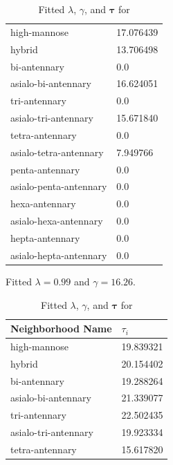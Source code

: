 \begin{table}[!htb]
\begin{threeparttable}
\begin{tabular}{l l}
                high-mannose & 17.076439 \\
                hybrid & 13.706498 \\
                bi-antennary & 0.0 \\
                asialo-bi-antennary & 16.624051 \\
                tri-antennary &  0.0 \\
                asialo-tri-antennary & 15.671840 \\
                tetra-antennary & 0.0 \\
                asialo-tetra-antennary & 7.949766 \\
                penta-antennary & 0.0 \\
                asialo-penta-antennary & 0.0 \\
                hexa-antennary & 0.0 \\
                asialo-hexa-antennary & 0.0 \\
                hepta-antennary & 0.0 \\
                asialo-hepta-antennary & 0.0 \\
                \bottomrule
            \end{tabular}
            \begin{tablenotes}[normal]
                \item Fitted $\lambda = 0.99$ and $\gamma = 16.26$.
            \end{tablenotes}
        \end{threeparttable}
        \hspace{1em}
        \begin{threeparttable}
            \caption{Fitted $\lambda$, $\gamma$, and $\mathbf{\tau}$ for
                     \rpserum \label{tab:rpserum_parameters}}
            \begin{tabular}{l l}
                \toprule    
                Neighborhood Name & $\tau_i$ \\
                \midrule
                high-mannose & 19.839321 \\
                hybrid & 20.154402 \\
                bi-antennary & 19.288264 \\
                asialo-bi-antennary & 21.339077 \\
                tri-antennary & 22.502435 \\
                asialo-tri-antennary & 19.923334 \\
                tetra-antennary & 15.617820 \\

\end{tabular}
\end{threeparttable}
\end{table}
